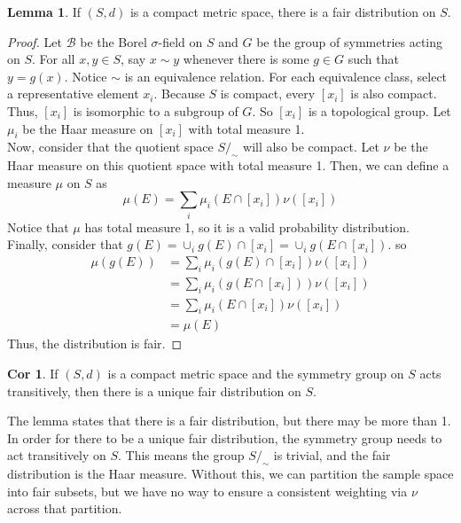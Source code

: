 \documentclass{article}
\theoremstyle{definition}\newtheorem{definition}{DEF}
\theoremstyle{definition}\newtheorem{example}{Ex}
\theoremstyle{lemma}\newtheorem{lemma}{Lemma}
\theoremstyle{corrolary}\newtheorem{corrolary}{Cor}
\begin{document}
\begin{lemma}
If $(S, d)$ is a compact metric space, there is a fair distribution on $S$.
\end{lemma}
\begin{proof}
Let $\mathcal{B}$ be the Borel $\sigma$-field on $S$ and $G$ be the group of symmetries acting on $S$.
For all $x, y \in S$, say $x \sim y$ whenever there is some $g \in G$ such that $y = g(x)$.
Notice $\sim$ is an equivalence relation.
For each equivalence class, select a representative element $x_i$.
Because $S$ is compact, every $[x_i]$ is also compact.
Thus, $[x_i]$ is isomorphic to a subgroup of $G$.
So $[x_i]$ is a topological group.
Let $\mu_i$ be the Haar measure on $[x_i]$ with total measure 1. \\
Now, consider that the quotient space $S/_\sim$ will also be compact.
Let $\nu$ be the Haar measure on this quotient space with total measure 1.
Then, we can define a measure $\mu$ on $S$ as
\begin{equation*}
\mu(E) = \sum_i \mu_i(E \cap [x_i]) \nu([x_i])
\end{equation*}
Notice that $\mu$ has total measure 1, so it is a valid probability distribution. \\
Finally, consider that $g(E) = \cup_i g(E) \cap [x_i]= \cup_i g(E \cap [x_i])$.
so
\begin{align*}
\mu(g(E)) &= \sum_i \mu_i (g(E) \cap [x_i]) \nu([x_i]) \\
&= \sum_i \mu_i (g(E \cap [x_i])) \nu([x_i]) \\
&= \sum_i \mu_i (E \cap [x_i]) \nu([x_i]) \\
&= \mu(E)
\end{align*}
Thus, the distribution is fair.
\end{proof}
\begin{corrolary}
If $(S, d)$ is a compact metric space and the symmetry group on $S$ acts transitively, then there is a unique fair distribution on $S$.
\end{corrolary}

The lemma states that there is a fair distribution, but there may be more than 1.
In order for there to be a unique fair distribution, the symmetry group needs to act transitively on $S$.
This means the group $S/_\sim$ is trivial, and the fair distribution is the Haar measure.
Without this, we can partition the sample space into fair subsets, but we have no way to ensure a consistent weighting via $\nu$ across that partition. \\
\end{document}
